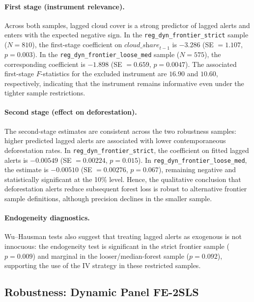 \documentclass[hidelinks,12pt]{article}
\begin{document}
\paragraph{First stage (instrument relevance).}
Across both samples, lagged cloud cover is a strong predictor of lagged alerts and enters with the expected negative sign. In the \nolinkurl{reg\_dyn\_frontier\_strict} sample ($N=810$), the first-stage coefficient on $\textit{cloud\_share}_{t-1}$ is $-3.286$ (SE $=1.107$, $p=0.003$). In the \texttt{reg\_dyn\_frontier\_loose\_med} sample ($N=575$), the corresponding coefficient is $-1.898$ (SE $=0.659$, $p=0.0047$). The associated first-stage $F$-statistics for the excluded instrument are $16.90$ and $10.60$, respectively, indicating that the instrument remains informative even under the tighter sample restrictions.

\paragraph{Second stage (effect on deforestation).}
The second-stage estimates are consistent across the two robustness samples: higher predicted lagged alerts are associated with lower contemporaneous deforestation rates. In \texttt{reg\_dyn\_frontier\_strict}, the coefficient on fitted lagged alerts is $-0.00549$ (SE $=0.00224$, $p=0.015$). In \texttt{reg\_dyn\_frontier\_loose\_med}, the estimate is $-0.00510$ (SE $=0.00276$, $p=0.067$), remaining negative and statistically significant at the 10\% level. Hence, the qualitative conclusion that deforestation alerts reduce subsequent forest loss is robust to alternative frontier sample definitions, although precision declines in the smaller sample.

\paragraph{Endogeneity diagnostics.}
Wu--Hausman tests also suggest that treating lagged alerts as exogenous is not innocuous: the endogeneity test is significant in the strict frontier sample ($p=0.009$) and marginal in the looser/median-forest sample ($p=0.092$), supporting the use of the IV strategy in these restricted samples.


\subsection{Robustness: Dynamic Panel FE-2SLS}
\label{sec:robust_dynamic}
\end{document}
